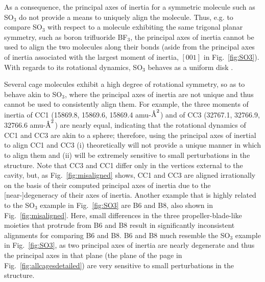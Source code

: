 \documentclass[journal=jacsat,manuscript=article]{achemso}
\newcommand{\angstrom}{\mbox{\normalfont\AA}}
\begin{document}
{As a consequence, the principal axes of inertia for a symmetric molecule such as SO$_3$ do not provide a means to uniquely align the molecule. Thus, e.g. to compare SO$_3$ with respect to a molecule exhibiting the same trigonal planar symmetry, such as boron trifluoride BF$_3$, the principal axes of inertia cannot be used to align the two molecules along their bonds (aside from the principal axes of inertia associated with the largest moment of inertia, $[0 0 1]$ in Fig.~\ref{fig:SO3}). With regards to its rotational dynamics, SO$_3$ behaves as a uniform disk \cite{peraire2008lecture}.

Several cage molecules exhibit a high degree of rotational symmetry, so as to behave akin to SO$_3$, where the principal axes of inertia are not unique and thus cannot be used to consistently align them. For example, the three moments of inertia of CC1 (15869.8, 15869.6, 15869.4 amu-$\angstrom^2$) and of CC3 (32767.1, 32766.9, 32766.6 amu-$\angstrom^2$) are nearly equal, indicating that the rotational dynamics of CC1 and CC3 are akin to a sphere; therefore, using the principal axes of inertial to align CC1 and CC3 (i) theoretically will not provide a unique manner in which to align them and (ii) will be extremely sensitive to small perturbations in the structure. Note that CC3 and CC1 differ only in the vertices external to the cavity, but, as Fig.~\ref{fig:misaligned} shows, CC1 and CC3 are aligned irrationally on the basis of their computed principal axes of inertia due to the [near-]degeneracy of their axes of inertia. Another example that is highly related to the SO$_3$ example in Fig.~\ref{fig:SO3} are B6 and B8, also shown in Fig.~\ref{fig:misaligned}. Here, small differences in the three propeller-blade-like moieties that protrude from B6 and B8 result in significantly inconsistent alignments for comparing B6 and B8. B6 and B8 much resemble the SO$_3$ example in Fig.~\ref{fig:SO3}, as two principal axes of inertia are nearly degenerate and thus the principal axes in that plane (the plane of the page in Fig.~\ref{fig:allcagesdetailed}) are very sensitive to small perturbations in the structure.

}
\end{document}

